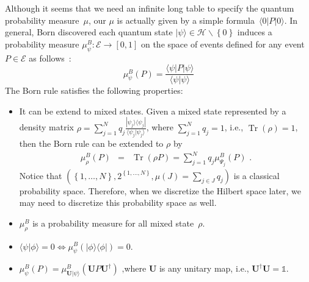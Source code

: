 \documentclass{article}
\theoremstyle{remark}
\newcommand{\qevents}{\ensuremath{\mathcal{E}}}
\newcommand{\pmeas}{\ensuremath{\mu}}
\newcommand{\Hilb}{\mathcal{H}}
\newcommand{\ket}[1]{|#1\rangle}
\newcommand{\ip}[2]{\langle #1 | #2 \rangle}
\newcommand{\proj}[1]{|#1 \rangle\langle #1 |}
\newcommand{\melement}[2]{ \langle #1 | #2 | #1 \rangle}
\newcommand{\Tr}{\mathop{\mathrm{Tr}}\nolimits}
\begin{document}
Although it seems that we need an infinite long table to specify the
quantum probability measure~$\mu$, our $\mu$ is actually
given by a simple formula~$\melement{0}{P}$. In general, Born discovered
each quantum state $\ket{\psi}\in\Hilb\backslash\left\{ 0\right\} $
induces a probability measure $\mu^B_{\psi}:\qevents\rightarrow[0,1]$
on the space of events defined for any event $P\in\qevents$ as follows~\cite{Born1983,Mermin2007}:
\begin{equation}
\mu^B_{\psi}(P)=\frac{\melement{\psi}{P}}{\ip{\psi}{\psi}}\label{eq:Born}
\end{equation}
The Born rule satisfies the following properties:
\begin{itemize}
\item It can be extend to mixed states. Given a mixed state represented
by a density matrix $\rho=\sum_{j=1}^{N}q_{j}\frac{\proj{\psi_{j}}}{\ip{\psi_{j}}{\psi_{j}}}$,
where $\sum_{j=1}^{N}q_{j}=1$, i.e., $\Tr\left(\rho\right)=1$, then
the Born rule can be extended to $\rho$ by 
\begin{eqnarray}
\mu^B_{\rho}\left(P\right) & = & \Tr\left(\rho P\right)=\sum_{j=1}^{N}q_{j}\mu^B_{\Psi_{j}}\left(P\right)\textrm{ .}\label{BornRule.mixed}
\end{eqnarray}
Notice that $\left(\left\{ 1,\ldots,N\right\} ,2^{\left\{ 1,\ldots,N\right\} },\pmeas\left(J\right)=\sum_{j\in J}q_{j}\right)$
is a classical probability space. Therefore, when we discretize the
Hilbert space later, we may need to discretize this probability space
as well.
\item $\mu^B_{\rho}$ is a probability measure for all mixed state~$\rho$.
\item $\ip{\psi}{\phi}=0\Leftrightarrow\mu^B_{\psi}\left(\proj{\phi}\right)=0$.
\item $\mu^B_{\psi}\left(P\right)=\mu^B_{\mathbf{U}\ket{\psi}}\left(\mathbf{U}P\mathbf{U}^{\dagger}\right)\textrm{ ,}$where
$\mathbf{U}$ is any unitary map, i.e., $\mathbf{U}^{\dagger}\mathbf{U}=\mathbb{1}$. 
\end{itemize}
\end{document}
